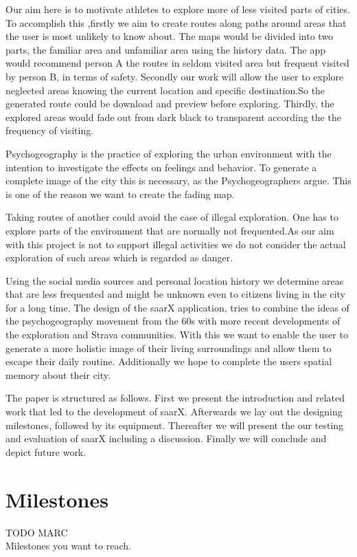 \documentclass{sigchi}
\begin{document}
Our aim here is to motivate athletes to explore more of less visited parts of cities. To accomplish this ,firstly we aim to create routes along paths around areas that
the user is most unlikely to know about. The maps would be divided into two parts, the familiar area and unfamiliar area using the history data. The app would recommend person A the routes in seldom visited area but frequent visited by person B, in terms of safety. Secondly our work will allow the user to explore neglected areas knowing the current location and specific destination.So the generated route could be download and preview before exploring. Thirdly, the explored areas would fade out from dark black to transparent according the the frequency of visiting.

Psychogeography is the practice of exploring the urban
environment with the intention to investigate the effects on feelings and behavior. To generate a complete image of the city this is necessary, as the Psychogeographers argue. This is one of the  reason we want to create the fading map.

Taking routes of another could avoid  the case of illegal exploration. One has to explore parts of the environment that are normally not frequented.As our aim with this project is not to support illegal activities we do not consider the actual exploration of such areas  which is regarded as danger.

 Using the social media sources and personal
location history we determine areas that are less frequented and might be unknown even to citizens living in the city for a long time. The design of the saarX application, tries to combine the ideas of the psychogeography movement from the 60s with more recent developments of the exploration and Strava communities. With this we want to enable the user to generate a more holistic image of their living surroundings and allow them to escape their daily routine. Additionally  we hope to complete the users spatial memory about their city.

The paper is structured as follows. First we present the introduction and related work that led to the development of saarX. Afterwards we lay out the designing milestones, followed by its equipment. Thereafter
we will present the our testing and evaluation
of saarX including a discussion. Finally we will conclude and depict future work.

\section{Milestones}
TODO MARC\\
Milestones you want to reach.
\end{document}
